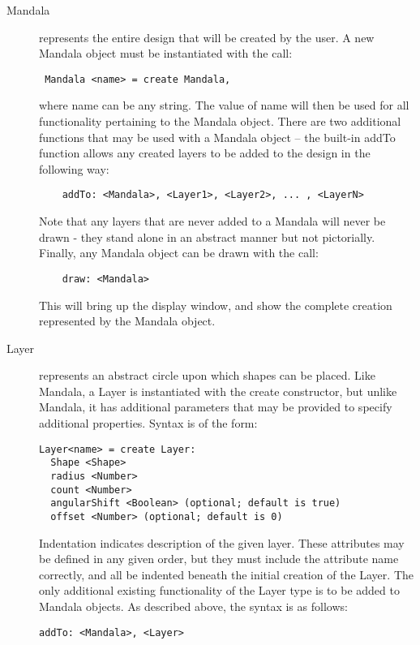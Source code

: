 \documentclass[12pt]{report}
\begin{document}
    \begin{description}
    
    \item[Mandala] represents the entire design that will be created by the user. A new Mandala object must be instantiated with the call:
 \begin{verbatim} Mandala <name> = create Mandala, \end{verbatim}
where name can be any string. The value of name will then be used for all functionality pertaining to the Mandala object. There are two additional functions that may be used with a Mandala object -- the built-in addTo function allows any created layers to be added to the design in the following way:
\begin{verbatim}	addTo: <Mandala>, <Layer1>, <Layer2>, ... , <LayerN> \end{verbatim}
Note that any layers that are never added to a Mandala will never be drawn - they stand alone in an abstract manner but not pictorially.
Finally, any Mandala object can be drawn with the call:
\begin{verbatim}	draw: <Mandala> \end{verbatim}
This will bring up the display window, and show the complete creation represented by the Mandala object.

    \item[Layer] represents an abstract circle upon which shapes can be placed. Like Mandala, a Layer is instantiated with the create constructor, but unlike Mandala, it has additional parameters that may be provided to specify additional properties. Syntax is of the form: 
\begin{verbatim}
Layer<name> = create Layer:
  Shape <Shape>
  radius <Number> 
  count <Number>
  angularShift <Boolean> (optional; default is true)
  offset <Number> (optional; default is 0)

\end{verbatim}

Indentation indicates description of the given layer. These attributes may be defined in any given order, but they must include the attribute name correctly, and all be indented beneath the initial creation of the Layer. The only additional existing functionality of the Layer type is to be added to Mandala objects. As described above, the syntax is as follows:
\begin{verbatim}
addTo: <Mandala>, <Layer>
\end{verbatim}
	

\end{description}
\end{document}
